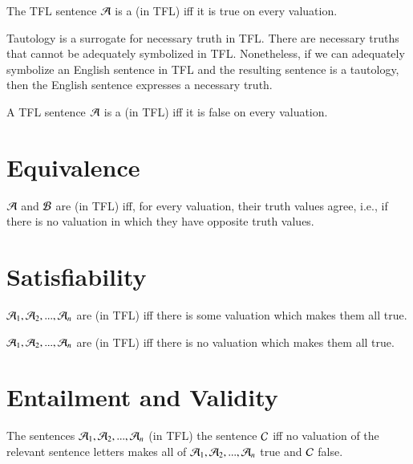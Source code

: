 \documentclass[12pt, a4paper, twoside, openright, titlepage]{book}
\begin{document}
\begin{defn}{}{}
    The TFL sentence $\mathcal{A}$ is a  (in TFL) iff it is true on every valuation.
\end{defn}

\begin{rmk}{}{}
    Tautology is a surrogate for necessary truth in TFL. There are necessary truths that cannot be adequately symbolized in TFL. Nonetheless, if we can adequately symbolize an English sentence in TFL and the resulting sentence is a tautology, then the English sentence expresses a necessary truth.
\end{rmk}


\begin{defn}{}{}
    A TFL sentence $\mathcal{A}$ is a  (in TFL) iff it is false on every valuation.
\end{defn}

\section{\textsection Equivalence}


\begin{defn}{}{}
    $\mathcal{A}$ and $\mathcal{B}$ are  (in TFL) iff, for every valuation, their truth values agree, i.e., if there is no valuation in which they have opposite truth values.
\end{defn}

\section{\textsection Satisfiability}

\begin{defn}{}{}
    $\mathcal{A}_1,\mathcal{A}_2,...,\mathcal{A}_n$ are  (in TFL) iff there is some valuation which makes them all true.
\end{defn}


\begin{defn}{}{}
    $\mathcal{A}_1,\mathcal{A}_2,...,\mathcal{A}_n$ are  (in TFL) iff there is no valuation which makes them all true. 
\end{defn}

\section{\textsection Entailment and Validity}


\begin{defn}{}{}
    The sentences $\mathcal{A}_1,\mathcal{A}_2,...,\mathcal{A}_n$  (in TFL) the sentence $\mathcal{C}$ iff no valuation of the relevant sentence letters makes all of $\mathcal{A}_1,\mathcal{A}_2,...,\mathcal{A}_n$ true and $\mathcal{C}$ false.
\end{defn}
\end{document}
